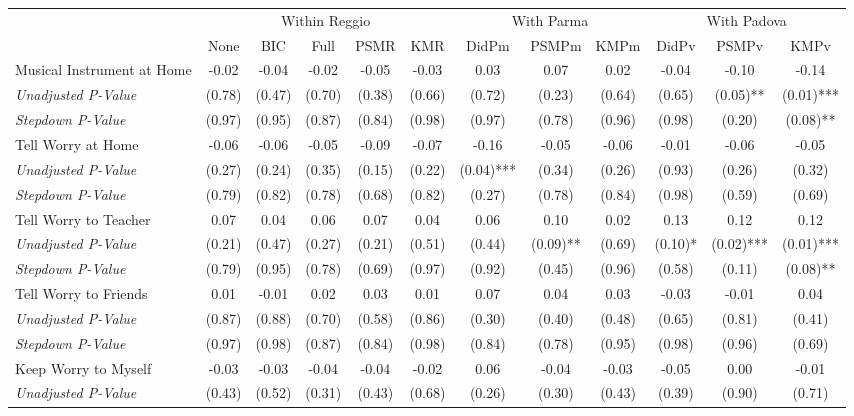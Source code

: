 \begin{tabular}{l c c c c c c c c c c c}
\toprule
& \multicolumn{5}{c}{Within Reggio} & \multicolumn{3}{c}{With Parma} & \multicolumn{3}{c}{With Padova} \\\cmidrule(lr){2-6} \cmidrule(lr){7-9} \cmidrule(lr){10-12}
 & None & BIC & Full & PSMR & KMR & DidPm & PSMPm & KMPm & DidPv & PSMPv & KMPv \\
\midrule
Musical Instrument at Home & -0.02 & -0.04 & -0.02 & -0.05 & -0.03 & 0.03 & 0.07 & 0.02 & -0.04 & -0.10 & -0.14 \\
\quad \textit{Unadjusted P-Value} & (0.78) & (0.47) & (0.70) & (0.38) & (0.66) & (0.72) & (0.23) & (0.64) & (0.65) & (0.05)** & (0.01)*** \\
\quad \textit{Stepdown P-Value} & (0.97) & (0.95) & (0.87) & (0.84) & (0.98) & (0.97) & (0.78) & (0.96) & (0.98) & (0.20) & (0.08)** \\
Tell Worry at Home & -0.06 & -0.06 & -0.05 & -0.09 & -0.07 & -0.16 & -0.05 & -0.06 & -0.01 & -0.06 & -0.05 \\
\quad \textit{Unadjusted P-Value} & (0.27) & (0.24) & (0.35) & (0.15) & (0.22) & (0.04)*** & (0.34) & (0.26) & (0.93) & (0.26) & (0.32) \\
\quad \textit{Stepdown P-Value} & (0.79) & (0.82) & (0.78) & (0.68) & (0.82) & (0.27) & (0.78) & (0.84) & (0.98) & (0.59) & (0.69) \\
Tell Worry to Teacher & 0.07 & 0.04 & 0.06 & 0.07 & 0.04 & 0.06 & 0.10 & 0.02 & 0.13 & 0.12 & 0.12 \\
\quad \textit{Unadjusted P-Value} & (0.21) & (0.47) & (0.27) & (0.21) & (0.51) & (0.44) & (0.09)** & (0.69) & (0.10)* & (0.02)*** & (0.01)*** \\
\quad \textit{Stepdown P-Value} & (0.79) & (0.95) & (0.78) & (0.69) & (0.97) & (0.92) & (0.45) & (0.96) & (0.58) & (0.11) & (0.08)** \\
Tell Worry to Friends & 0.01 & -0.01 & 0.02 & 0.03 & 0.01 & 0.07 & 0.04 & 0.03 & -0.03 & -0.01 & 0.04 \\
\quad \textit{Unadjusted P-Value} & (0.87) & (0.88) & (0.70) & (0.58) & (0.86) & (0.30) & (0.40) & (0.48) & (0.65) & (0.81) & (0.41) \\
\quad \textit{Stepdown P-Value} & (0.97) & (0.98) & (0.87) & (0.84) & (0.98) & (0.84) & (0.78) & (0.95) & (0.98) & (0.96) & (0.69) \\
Keep Worry to Myself & -0.03 & -0.03 & -0.04 & -0.04 & -0.02 & 0.06 & -0.04 & -0.03 & -0.05 & 0.00 & -0.01 \\
\quad \textit{Unadjusted P-Value} & (0.43) & (0.52) & (0.31) & (0.43) & (0.68) & (0.26) & (0.30) & (0.43) & (0.39) & (0.90) & (0.71) \\

\end{tabular}
